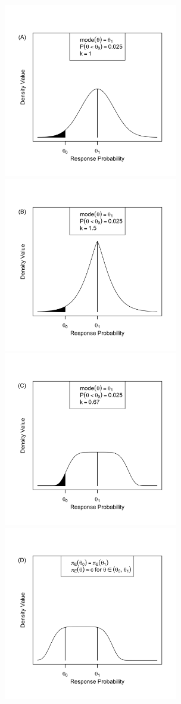 \documentclass[AMA,STIX1COL,doublespace]{WileyNJD-v2}
\begin{document}
\begin{figure}
\begin{center}
\includegraphics[width=3in]{figure1a.png}
\includegraphics[width=3in]{figure1b.png}
\includegraphics[width=3in]{figure1c.png}
\includegraphics[width=3in]{figure1d.png}

\end{center}
\end{figure}
\end{document}
